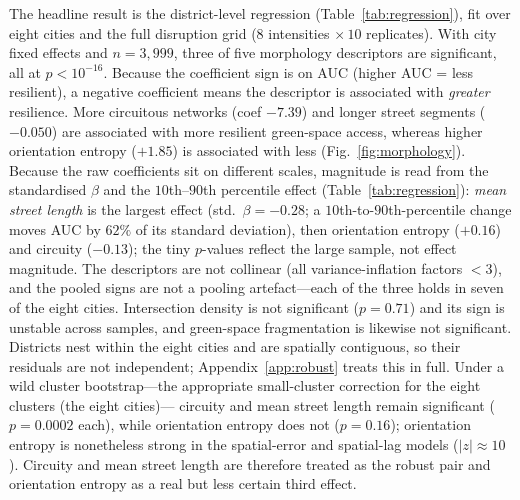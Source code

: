 The headline result is the district-level regression (Table~\ref{tab:regression}),
fit over eight cities and the full disruption grid ($8$ intensities $\times\,10$
replicates). With city fixed effects and $n=3{,}999$, three of five morphology
descriptors are significant, all at $p<10^{-16}$. Because the coefficient sign is on
AUC (higher AUC = less resilient), a negative coefficient means the descriptor is
associated with \emph{greater} resilience. More circuitous networks (coef $-7.39$)
and longer street segments ($-0.050$) are associated with more resilient green-space
access, whereas higher orientation entropy ($+1.85$) is associated with less
(Fig.~\ref{fig:morphology}). Because the raw coefficients sit on different scales, magnitude is
read from the standardised $\beta$ and the $10$th--$90$th percentile effect
(Table~\ref{tab:regression}): \emph{mean street length} is the largest effect (std.\
$\beta=-0.28$; a $10$th-to-$90$th-percentile change moves AUC by $62\%$ of its
standard deviation), then orientation entropy ($+0.16$) and circuity ($-0.13$); the
tiny $p$-values reflect the large sample, not effect magnitude. The descriptors are
not collinear (all variance-inflation factors $<3$), and the pooled signs are not a
pooling artefact---each of the three holds in seven of the eight cities. Intersection
density is not significant ($p=0.71$) and its sign is unstable across samples, and
green-space fragmentation is likewise not significant. Districts nest within the eight
cities and are spatially contiguous, so their residuals are not independent;
Appendix~\ref{app:robust} treats this in full. Under a wild cluster bootstrap---the
appropriate small-cluster correction for the eight clusters (the eight cities)---
circuity and mean street length remain significant ($p=0.0002$ each), while
orientation entropy does not ($p=0.16$); orientation entropy is nonetheless strong in
the spatial-error and spatial-lag models ($|z|\approx10$). Circuity
and mean street length are therefore treated as the robust pair and orientation entropy as a real but
less certain third effect.

